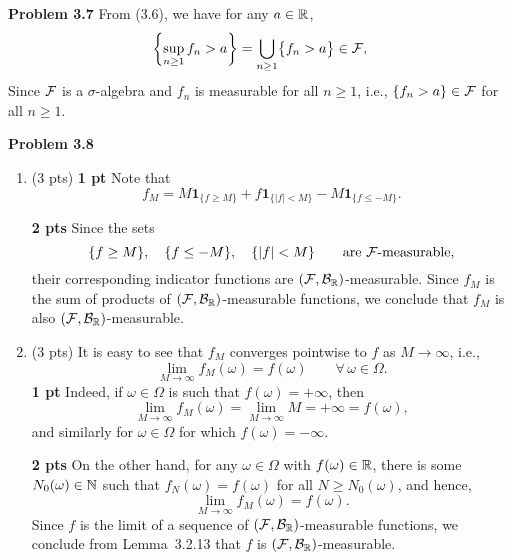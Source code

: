 \bigskip

\textbf{Problem 3.7} 
From (3.6), we have for any $a\in\mathbb R$,
\[
	\left\{ \sup_{n\ge 1} f_n>a\right\} = \bigcup_{n\ge 1} \bigl\{ f_n>a\bigr\}\in\mathcal F,
\]
Since $\mathcal F$ is a $\sigma$-algebra and $f_n$ is measurable for all $n\ge 1$, i.e., $\{f_n>a\}\in\mathcal F$ for all $n\ge 1$.


\bigskip

\textbf{Problem 3.8}

\begin{enumerate}[label=(\alph*)]
	\item (3 pts) 
	\textbf{1 pt}
	Note that
	\[
		f_M = M\mathbf{1}_{\{f\ge M\}} + f\mathbf{1}_{\{|f|< M\}} - M\mathbf{1}_{\{f\le -M\}}.
	\]
	
	\textbf{2 pts}
	Since the sets
	\[
		\{f\ge M\},\quad \{f\le -M\},\quad \{|f|<M\}\qquad\text{are $\mathcal F$-measurable},
	\]
	their corresponding indicator functions are $(\mathcal F,\mathcal B_{\mathbb R})$-measurable. Since $f_M$ is the sum of products of $(\mathcal F,\mathcal B_{\mathbb R})$-measurable functions, we conclude that $f_M$ is also $(\mathcal F,\mathcal B_{\mathbb R})$-measurable.
	
	\item (3 pts) It is easy to see that $f_M$ converges pointwise to $f$ as $M\to\infty$, i.e.,
	\[
		\lim_{M\to\infty} f_M(\omega) = f(\omega)\qquad\forall\, \omega\in\Omega.
	\]
	\textbf{1 pt}
	Indeed, if $\omega \in \Omega$ is such that $f(\omega)=+\infty$, then
	\[
		\lim_{M\to\infty} f_M(\omega) = \lim_{M\to\infty} M = +\infty = f(\omega),
	\]
	and similarly for $\omega\in\Omega$ for which $f(\omega)=-\infty$. 
	
	\textbf{2 pts}
	On the other hand, for any $\omega\in\Omega$ with $f(\omega)\in\mathbb R$, there is some $N_0(\omega)\in\mathbb N$ such that $f_N(\omega)=f(\omega)$ for all $N\ge N_0(\omega)$, and hence,
	\[
		\lim_{M\to\infty} f_M(\omega) = f(\omega).
	\]
	Since $f$ is the limit of a sequence of $(\mathcal F,\mathcal B_{\mathbb R})$-measurable functions, we conclude from Lemma~3.2.13 that $f$ is $(\mathcal F,\mathcal B_{\mathbb R})$-measurable.
\end{enumerate}



